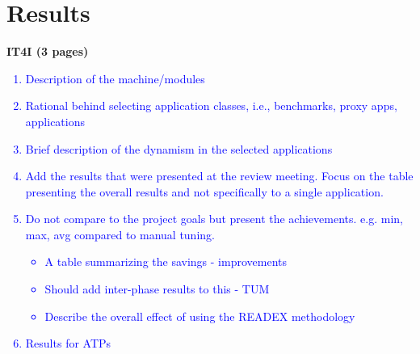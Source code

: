 \section{Results} \label{sec:results}
\textbf{IT4I (3 pages)}
\textcolor{blue}{\begin{enumerate}
	\item Description of the machine/modules
	\item Rational behind selecting application classes, i.e., benchmarks, proxy apps, applications
	\item Brief description of the dynamism in the selected applications
	\item Add the results that were presented at the review meeting. Focus on the table presenting the overall results and not specifically to a single application. 
	\item Do not compare to the project goals but present the achievements. e.g. min, max, avg compared to manual tuning. 
	\begin{itemize}
		\item A table summarizing the savings - improvements
		\item Should add inter-phase results to this - TUM
		\item Describe the overall effect of using the READEX methodology
	\end{itemize}
	\item Results for ATPs
\end{enumerate}}